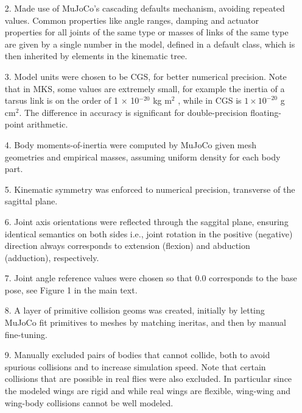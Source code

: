 \documentclass[sn-mathphys-num]{sn-jnl}%
\theoremstyle{thmstyleone}	%
\theoremstyle{thmstyletwo}	%
\theoremstyle{thmstylethree}	%
\begin{document}
\begin{appendices}
\begin{itemize}
	\item[2.] 
	Made use of MuJoCo's cascading defaults mechanism, avoiding repeated values. 
	Common properties like angle ranges, damping and actuator properties for all joints of the same type or masses of links of the same type are given by a single number in the model, defined in a default class, which is then inherited by elements in the kinematic tree.
	
	\item[3.] 
	Model units were chosen to be CGS, for better numerical precision. 
	Note that in MKS, some values are extremely small, for example the inertia of a tarsus link is on the order of 1 × 10$ ^{-20} $ kg m$ ^2 $ , while in CGS is $1 \times 10 ^{-20} $ g cm$ ^2 $. 
	The difference in accuracy is significant for double-precision floating-point arithmetic.
	
	
	\item[4.] 
	Body moments-of-inertia were computed by MuJoCo given mesh geometries and empirical masses, assuming uniform density for each body part.
	
	
	\item[5. ] 
	Kinematic symmetry was enforced to numerical precision, transverse of the sagittal plane.
	
	
	\item[6.] 
	Joint axis orientations were reflected through the saggital plane, ensuring identical semantics on both sides i.e., joint rotation in the positive (negative) direction always corresponds to extension (flexion) and abduction (adduction), respectively.
	
	
	\item[7.] 
	Joint angle reference values were chosen so that 0.0 corresponds to the base pose, see Figure 1 in the main text.
	
	
	\item[8.] 
	A layer of primitive collision geoms was created, initially by letting MuJoCo fit primitives to meshes by matching ineritas, and then by manual fine-tuning.
	
	
	\item[9.] 
	Manually excluded pairs of bodies that cannot collide, both to avoid spurious collisions and to increase simulation speed. 
	Note that certain collisions that are possible in real flies were also excluded. 
	In particular since the modeled wings are rigid and while real wings are flexible, wing-wing and wing-body collisions cannot be well modeled.
	

\end{itemize}
\end{appendices}
\end{document}
